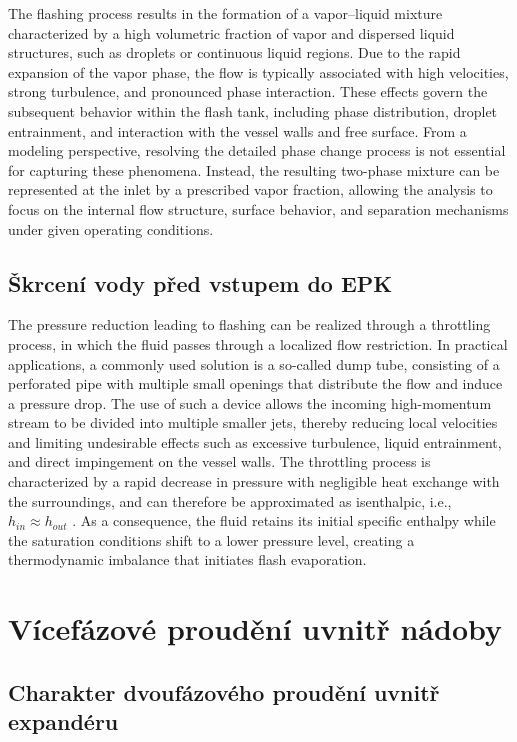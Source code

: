 The flashing process results in the formation of a vapor--liquid mixture characterized by a high volumetric fraction of vapor and dispersed liquid structures, such as droplets or continuous liquid regions. Due to the rapid expansion of the vapor phase, the flow is typically associated with high velocities, strong turbulence, and pronounced phase interaction. These effects govern the subsequent behavior within the flash tank, including phase distribution, droplet entrainment, and interaction with the vessel walls and free surface. From a modeling perspective, resolving the detailed phase change process is not essential for capturing these phenomena. Instead, the resulting two-phase mixture can be represented at the inlet by a prescribed vapor fraction, allowing the analysis to focus on the internal flow structure, surface behavior, and separation mechanisms under given operating conditions.

\subsection{Škrcení vody před vstupem do EPK}

The pressure reduction leading to flashing can be realized through a throttling process, in which the fluid passes through a localized flow restriction. In practical applications, a commonly used solution is a so-called dump tube, consisting of a perforated pipe with multiple small openings that distribute the flow and induce a pressure drop. The use of such a device allows the incoming high-momentum stream to be divided into multiple smaller jets, thereby reducing local velocities and limiting undesirable effects such as excessive turbulence, liquid entrainment, and direct impingement on the vessel walls. The throttling process is characterized by a rapid decrease in pressure with negligible heat exchange with the surroundings, and can therefore be approximated as isenthalpic, i.e., $h_{in} \approx h_{out}$ \cite{Moran_Shapiro}. As a consequence, the fluid retains its initial specific enthalpy while the saturation conditions shift to a lower pressure level, creating a thermodynamic imbalance that initiates flash evaporation.


\section{Vícefázové proudění uvnitř nádoby}

\subsection{Charakter dvoufázového proudění uvnitř expandéru}

